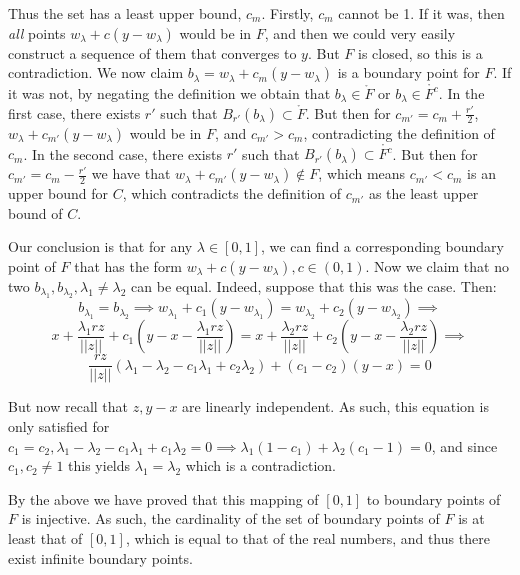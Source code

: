 \begin{solution}
    Thus the set has a least upper bound, $c_m$. Firstly, $c_m$ cannot be 1. If it was, then \textit{all} points $w_\lambda + c(y - w_\lambda)$ would be in $F$, and then we could very easily construct a sequence of them that converges to $y$. But $F$ is closed, so this is a contradiction. We now claim $b_\lambda = w_\lambda + c_m(y-w_\lambda)$ is a boundary point for $F$. If it was not, by negating the definition we obtain that $b_\lambda \in \mathring{F}$ or $b_\lambda \in \mathring{F^c}$. In the first case, there exists $r'$ such that $B_{r'}(b_\lambda) \subset \mathring{F}$. But then for $c_{m'} = c_m + \frac{r'}{2}$, $w_\lambda + c_{m'}(y - w_\lambda)$ would be in $F$, and $c_{m'} > c_m$, contradicting the definition of $c_m$. In the second case, there exists $r'$ such that $B_{r'}(b_\lambda) \subset \mathring{F^c}$. But then for $c_{m'} = c_m - \frac{r'}{2}$ we have that $w_\lambda + c_{m'}(y - w_\lambda) \notin F$, which means $c_{m'} < c_m$ is an upper bound for $C$, which contradicts the definition of $c_{m'}$ as the least upper bound of $C$.

    Our conclusion is that for any $\lambda \in [0, 1]$, we can find a corresponding boundary point of $F$ that has the form $w_\lambda + c(y - w_\lambda), c \in (0, 1)$. Now we claim that no two $b_{\lambda_1}, b_{\lambda_2}, \lambda_1 \neq \lambda_2$ can be equal. Indeed, suppose that this was the case. Then:
    $$b_{\lambda_1} = b_{\lambda_2} \implies w_{\lambda_1} + c_1(y - w_{\lambda_1}) = w_{\lambda_2} + c_2(y - w_{\lambda_2}) \implies $$
    $$x + \frac{\lambda_1 r z}{\lvert \lvert z \rvert \rvert} + c_1(y - x - \frac{\lambda_1 r z}{\lvert \lvert z \rvert \rvert}) = x + \frac{\lambda_2 r z}{\lvert \lvert z \rvert \rvert} + c_2(y - x - \frac{\lambda_2 r z}{\lvert \lvert z \rvert \rvert}) \implies $$
    $$\frac{r z }{\lvert \lvert z \rvert \rvert}(\lambda_1 - \lambda_2 - c_1\lambda_1 + c_2\lambda_2) + (c_1 - c_2)(y -x ) = 0$$

    But now recall that $z, y - x$ are linearly independent. As such, this equation is only satisfied for $c_1 = c_2, \lambda_1 - \lambda_2 - c_1\lambda_1 + c_1\lambda_2 = 0 \implies \lambda_1(1 - c_1) + \lambda_2 (c_1 - 1) = 0$, and since $c_1, c_2 \neq 1$ this yields $\lambda_1 = \lambda_2$ which is a contradiction.

    By the above we have proved that this mapping of $[0, 1]$ to boundary points of $F$ is injective. As such, the cardinality of the set of boundary points of $F$ is at least that of $[0, 1]$, which is equal to that of the real numbers, and thus there exist infinite boundary points.
    
\end{solution}

